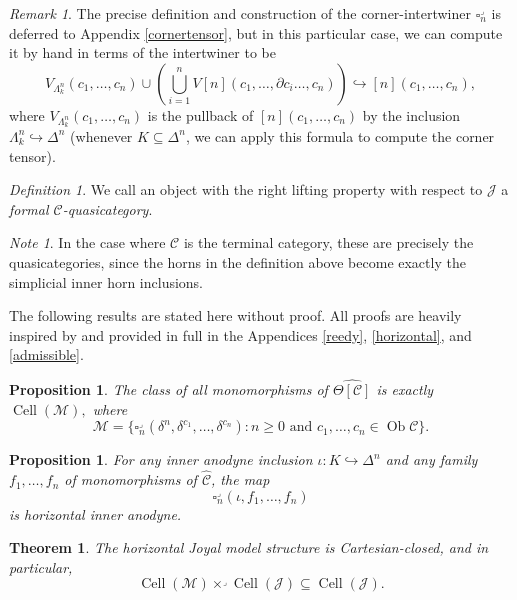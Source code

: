 \documentclass{amsart}
\numberwithin{equation}{section}
\theoremstyle{plain}   %
\newtheorem{thm}[subsection]{Theorem}
\newtheorem{prop}[subsection]{Proposition}
\theoremstyle{remark}
\newtheorem{rem}[subsection]{Remark}
\newtheorem{note}[subsection]{Note}
\newtheorem{defn}[subsection]{Definition}
\theoremstyle{plain}
\DeclareMathOperator{\Ob}{Ob}
\newcommand{\psh}[1]{\ensuremath{\widehat{#1}}}
\newcommand{\C}{\ensuremath{\mathcal{C}}}
\newcommand{\cellset}{\ensuremath{\widehat{\Theta[\mathcal{C}]}}}
\begin{document}
\begin{rem}
	The precise definition and construction of the corner-intertwiner \(\square^\lrcorner_n\) is deferred to Appendix \ref{cornertensor}, but in this particular case, we can compute it by hand in terms of the intertwiner to be \[V_{\Lambda^n_k}(c_1,\dots,c_n) \cup \left(\bigcup_{i=1}^n V[n](c_1,\dots,\partial c_i \dots, c_n) \right) \hookrightarrow [n](c_1,\dots,c_n),\] where \(V_{\Lambda^n_k}(c_1,\dots,c_n)\) is the pullback of \([n](c_1,\dots,c_n)\) by the inclusion \(\Lambda^n_k\hookrightarrow \Delta^n\) (whenever \(K\subseteq \Delta^n\), we can apply this formula to compute the corner tensor).
\end{rem}

\begin{defn}
	We call an object with the right lifting property with respect to \(\mathscr{J}\) a \emph{formal \(\C\)-quasicategory}.
\end{defn}

\begin{note} 
	In the case where \(\C\) is the terminal category, these are precisely the quasicategories, since the horns in the definition above become exactly the simplicial inner horn inclusions.
\end{note}

The following results are stated here without proof.  All proofs are heavily inspired by \cite{oury} and provided in full in the Appendices \ref{reedy}, \ref{horizontal}, and \ref{admissible}.

\begin{prop}
	The class of all monomorphisms of \(\cellset\) is exactly \(\operatorname{Cell}(\mathscr{M}),\) where \[\mathscr{M}=\{\square_n^\lrcorner(\delta^n,\delta^{c_1},\dots,\delta^{c_n}) : n\geq 0 \text{ and } c_1,\dots,c_n \in \Ob \C\}.\]
\end{prop}

\begin{prop}
	For any inner anodyne inclusion \(\iota:K\hookrightarrow \Delta^n\) and any family \(f_1,\dots,f_n\) of monomorphisms of \(\psh{\C}\), the map \[\square^\lrcorner_n(\iota,f_1,\dots,f_n)\] is horizontal inner anodyne.
\end{prop}

\begin{thm} The horizontal Joyal model structure is Cartesian-closed, and in particular, \[\operatorname{Cell}(\mathscr{M})\times^\lrcorner \operatorname{Cell}(\mathscr{J}) \subseteq \operatorname{Cell}(\mathscr{J}).\]
\end{thm}
\end{document}
